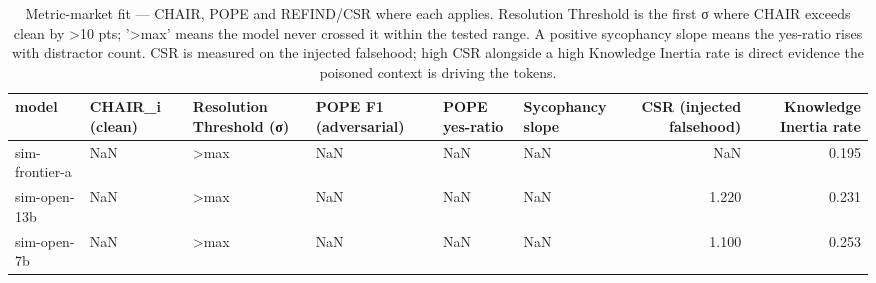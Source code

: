 \begin{table}[t]
\centering
\small
\begin{tabular}{llllllrr}
\toprule
model & CHAIR\_i (clean) & Resolution Threshold (σ) & POPE F1 (adversarial) & POPE yes-ratio & Sycophancy slope & CSR (injected falsehood) & Knowledge Inertia rate \\
\midrule
sim-frontier-a & NaN & >max & NaN & NaN & NaN & NaN & 0.195 \\
sim-open-13b & NaN & >max & NaN & NaN & NaN & 1.220 & 0.231 \\
sim-open-7b & NaN & >max & NaN & NaN & NaN & 1.100 & 0.253 \\
\bottomrule
\end{tabular}
\caption{Metric-market fit — CHAIR, POPE and REFIND/CSR where each applies. Resolution Threshold is the first σ where CHAIR exceeds clean by >10 pts; '>max' means the model never crossed it within the tested range. A positive sycophancy slope means the yes-ratio rises with distractor count. CSR is measured on the injected falsehood; high CSR alongside a high Knowledge Inertia rate is direct evidence the poisoned context is driving the tokens.}
\end{table}
